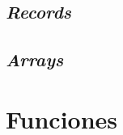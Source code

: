 \documentclass{article}
\begin{document}
\subsection{\emph{Records}}


\begin{quote}

\end{quote}

\begin{quote}

\end{quote}


\subsection{\emph{Arrays}}


\begin{quote}

\end{quote}

\begin{quote}

\end{quote}

\section{Funciones}





\end{document}
